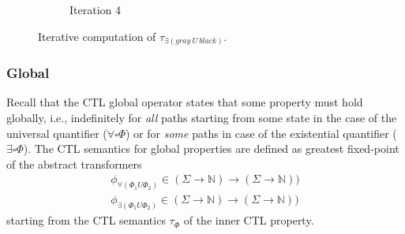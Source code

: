 \documentclass[11pt,a4paper,titlepage]{article}
\theoremstyle{definition}
\begin{document}
\begin{figure}
\begin{subfigure}[b]{0.32\textwidth}
{
        }
        \caption{Iteration 4}
    \end{subfigure}
    \caption{Iterative computation of $\tau_{\exists(gray \ U \ black)}$.} 
    \label{fig:ctl_semantics_existential_until}
\end{figure}


\subsubsection*{Global}

Recall that the CTL \textsf{global} operator states that some property must hold globally, i.e., indefinitely for 
\textit{all} paths starting from some state in the case of the universal
quantifier ($\forall\square\Phi$) or for \textit{some} paths in case of the existential quantifier ($\exists\square\Phi$). 
The CTL semantics for \textsf{global} properties are defined as greatest fixed-point of the abstract transformers
\begin{align*}
    \phi_{\forall(\Phi_1 U \Phi_2)} \in (\Sigma \rightarrow \mathbb{N}) \rightarrow (\Sigma \rightarrow \mathbb{N}))\\
    \phi_{\exists(\Phi_1 U \Phi_2)} \in (\Sigma \rightarrow \mathbb{N}) \rightarrow (\Sigma \rightarrow \mathbb{N}))
\end{align*}
starting from the CTL semantics $\tau_\Phi$ of the inner CTL property.
\end{document}
